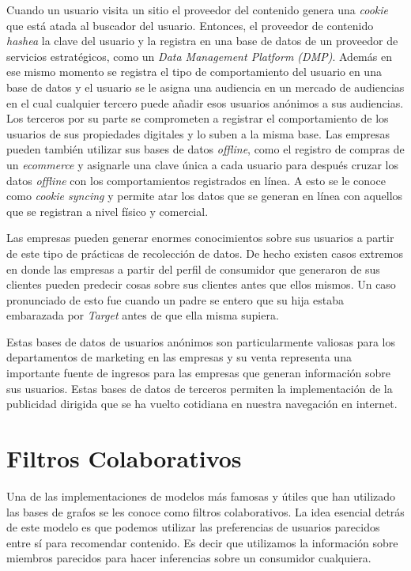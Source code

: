 Cuando un usuario visita un sitio el proveedor del contenido genera una \textit{cookie} que está atada al buscador del usuario. Entonces, el proveedor de contenido \textit{hashea} la clave del usuario y la registra en una base de datos de un proveedor de servicios estratégicos, como un \textit{Data Management Platform (DMP)}. Además en ese mismo momento se registra el tipo de comportamiento del usuario en una base de datos y el usuario se le asigna una audiencia en un mercado de audiencias en el cual cualquier tercero puede añadir esos usuarios anónimos a sus audiencias. Los terceros por su parte se comprometen a registrar el comportamiento de los usuarios de sus propiedades digitales y lo suben a la misma base. Las empresas pueden también utilizar sus bases de datos \textit{offline}, como el registro de compras de un \textit{ecommerce}  y asignarle una clave única a cada usuario para después cruzar los datos \textit{offline} con los comportamientos registrados en línea. A esto se le conoce como \textit{cookie syncing} y permite atar los datos que se generan en línea con aquellos que se registran a nivel físico y comercial.

Las empresas pueden generar enormes conocimientos sobre sus usuarios a partir de este tipo de prácticas de recolección de datos. De hecho existen casos extremos en donde las empresas a partir del perfil de consumidor que generaron de sus clientes pueden predecir cosas sobre sus clientes antes que ellos mismos. Un caso pronunciado de esto fue cuando un padre se entero que su hija estaba embarazada por \textit{Target} antes de que ella misma supiera. 

Estas bases de datos de usuarios anónimos son particularmente valiosas para los departamentos de marketing en las empresas y su venta representa una importante fuente de ingresos para las empresas que generan información sobre sus usuarios. Estas bases de datos de terceros permiten la implementación de la publicidad dirigida que se ha vuelto cotidiana en nuestra navegación en internet.

\section{Filtros Colaborativos}

Una de las implementaciones de modelos más famosas y útiles que han utilizado las bases de grafos se les conoce como filtros colaborativos. La idea esencial detrás de este modelo es que podemos utilizar las preferencias de usuarios parecidos entre sí para recomendar contenido. Es decir que utilizamos la información sobre miembros parecidos para hacer inferencias sobre un consumidor cualquiera.

